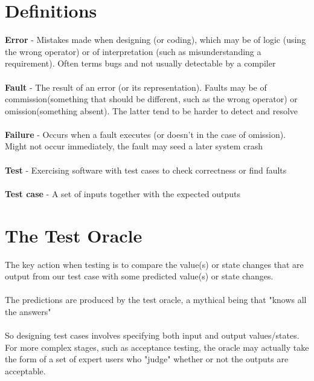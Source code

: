 \documentclass{article}[18pt]
\begin{document}
\section{Definitions}
\textbf{Error} - Mistakes made when designing (or coding), which may be of logic (using the wrong operator) or of interpretation (such as misunderstanding a requirement). Often terms bugs and not usually detectable by a compiler\\
\\
\textbf{Fault} - The result of an error (or its representation). Faults may be of commission(something that should be different, such as the wrong operator) or omission(something absent). The latter tend to be harder to detect and resolve\\
\\
\textbf{Failure} - Occurs when a fault executes (or doesn't in the case of omission). Might not occur immediately, the fault may seed a later system crash\\
\\
\textbf{Test} - Exercising software with test cases to check correctness or find faults\\
\\
\textbf{Test case} - A set of inputs together with the expected outputs
\section{The Test Oracle}
The key action when testing is to compare the value(s) or state changes that are output from our test case with some predicted value(s) or state changes.\\
\\
The predictions are produced by the test oracle, a mythical being that "knows all the answers"\\
\\
So designing test cases involves specifying both input and output values/states. For more complex stages, such as acceptance testing, the oracle may actually take the form of a set of expert users who "judge" whether or not the outputs are acceptable.
\end{document}
